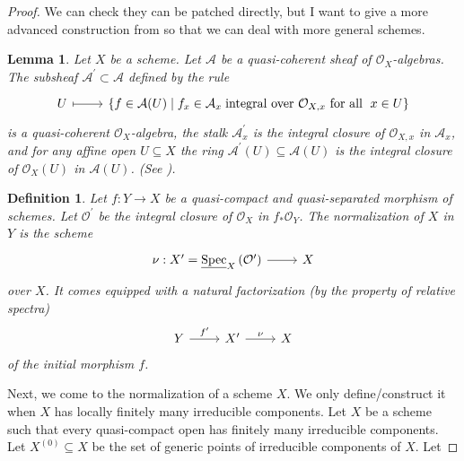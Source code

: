 \documentclass{amsart}
\newtheorem{defn}[theorem]{Definition}
\newtheorem{lm}[theorem]{Lemma}
\begin{document}
\begin{proof}
We can check they can be patched directly,  but I want to give a more advanced construction from \cite{stacks-project} so that we can deal with more general schemes. 
\begin{lm}
 Let $X$ be a scheme. Let $\mathcal{A}$ be a quasi-coherent sheaf of $\mathcal{O}_{X}$-algebras.  The subsheaf $\mathcal{A}^{\prime} \subset \mathcal{A}$ defined by the rule
 \begin{equation*}
 	\begin{tikzcd}
 		U \arrow[r, maps to] & \left\{f \in \mathcal{A}(U) \mid f_{x} \in \mathcal{A}_{x}\right.\text{integral over }\mathcal{O}_{X, x}\text{ for all }\left.x \in U\right\}
 	\end{tikzcd}
 \end{equation*}
is a quasi-coherent $\mathcal{O}_{X}$-algebra, the stalk $\mathcal{A}_{x}^{\prime}$ is the integral closure of $\mathcal{O}_{X, x}$ in $\mathcal{A}_{x}$, and for any affine open $U \subseteq X$ the ring $\mathcal{A}^{\prime}(U) \subseteq \mathcal{A}(U)$ is the integral closure of $\mathcal{O}_{X}(U)$ in $\mathcal{A}(U)$.   \emph{(See \cite[\href{https://stacks.math.columbia.edu/tag/035F}{Tag 035F}]{stacks-project}).}
\end{lm}
\begin{defn}
Let $f: Y \rightarrow X$ be a quasi-compact and quasi-separated morphism of schemes. Let $\mathcal{O}^{\prime}$ be the integral closure of $\mathcal{O}_{X}$ in $f_{*} \mathcal{O}_{Y}$. The normalization of $X$ in $Y$ is the scheme
\begin{equation*}
	\begin{tikzcd}
		\nu: X^{\prime}=\underline{\operatorname{Spec}}_{X}\left(\mathcal{O}^{\prime}\right) \arrow[r] & X
	\end{tikzcd}
\end{equation*}
over $X$.  It comes equipped with a natural factorization (by the property of relative spectra)
\begin{equation*}
	\begin{tikzcd}
		Y \arrow[r, "f'"] & X' \arrow[r, "\nu"] & X
	\end{tikzcd}
\end{equation*}
of the initial morphism $f$.
\end{defn}
Next, we come to the normalization of a scheme $X .$ We only define/construct it when $X$ has locally finitely many irreducible components. Let $X$ be a scheme such that every quasi-compact open has finitely many irreducible components. Let $X^{(0)} \subseteq X$ be the set of generic points of irreducible components of $X .$ Let

\end{proof}
\end{document}

